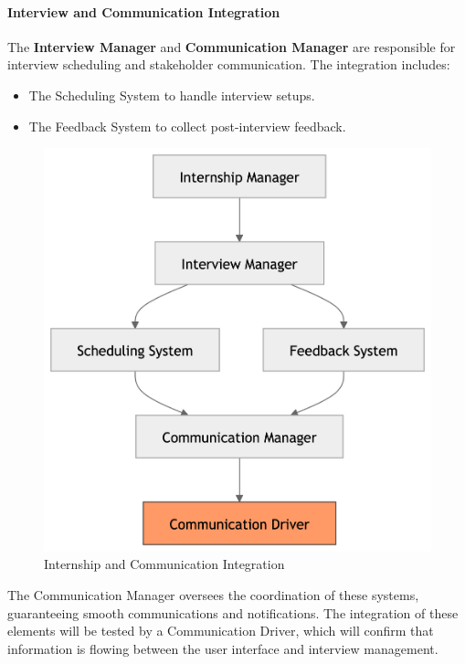 \paragraph{Interview and Communication Integration}
The \textbf{Interview Manager} and \textbf{Communication Manager} are responsible for interview scheduling and stakeholder communication. The integration includes:
\begin{itemize}
    \item The Scheduling System to handle interview setups.
    \item The Feedback System to collect post-interview feedback.
\end{itemize}
\begin{figure}[H]
    \begin{center}
        \includegraphics[width=0.59\linewidth]{JhaBhatiaSharma/imagesDD/InterviewandCommunicationIntegration.png}
        \caption{Internship and Communication Integration}
        \label{fig:internshipManagement}
    \end{center}
\end{figure}
The Communication Manager oversees the coordination of these systems, guaranteeing smooth communications and notifications. The integration of these elements will be tested by a Communication Driver, which will confirm that information is flowing between the user interface and interview management.


